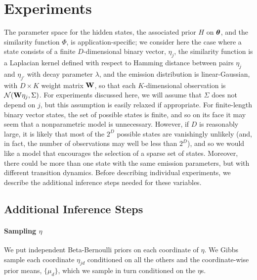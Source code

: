 \section{Experiments}
\label{sec:experiments}

The parameter space for the hidden states, the associated prior $H$ on
$\boldsymbol{\theta}$, and the similarity function
$\Phi$, is application-specific; we consider here the case where a state
consists of a finite $D$-dimensional binary vector, $\eta_j$, the similarity
function is a Laplacian kernel defined with respect to Hamming
distance between pairs $\eta_j$ and $\eta_{j'}$ with decay parameter
$\lambda$, and the emission distribution is linear-Gaussian, with $D
\times K$ weight matrix $\mathbf{W}$, so that each $K$-dimensional
observation is $\mathcal{N}(\mathbf{W} \eta_j,\Sigma)$.  For experiments discussed
here, we will assume that $\Sigma$ does not depend on $j$, but this assumption
is easily relaxed if appropriate.  For finite-length binary vector
states, the set of possible states is finite, and so on its face it may
seem that a nonparametric model is unnecessary.  However, if $D$ is
reasonably large, it is likely that most of the $2^D$ possible states
are vanishingly unlikely (and, in fact, the number of observations may
well be less than $2^D$), and so we would like a model that encourages
the selection of a sparse set of states.  Moreover, there could be more
than one state with the same emission parameters, but with different transition
dynamics.  Before describing individual experiments, we describe the additional
inference steps needed for these variables.

\subsection{Additional Inference Steps}
\label{sec:sampling-eta}

\paragraph{Sampling $\eta$} We put independent Beta-Bernoulli priors
on each coordinate of $\eta$.  We Gibbs sample each coordinate $\eta_{jd}$
conditioned on all the others and the coordinate-wise prior means,
$\{\mu_d\}$, which we sample in turn conditioned on the $\eta$s.

